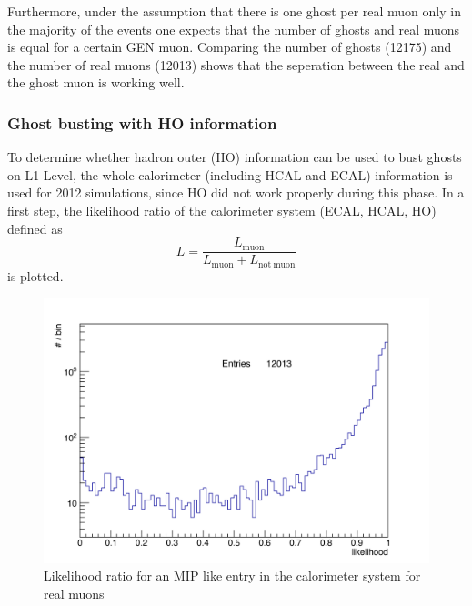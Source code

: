 Furthermore, under the assumption that there is one ghost per real muon only in the majority of the events one expects that the number of ghosts and real muons is equal for a certain GEN muon. Comparing the number of ghosts (12175) and the number of real muons (12013) shows that the seperation between the real and the ghost muon is working well.

\subsubsection{Ghost busting with HO information}
To determine whether hadron outer (HO) information can be used to bust ghosts on L1 Level, the whole calorimeter (including HCAL and ECAL) information is used for 2012 simulations, since HO did not work properly during this phase. In a first step, the likelihood ratio of the calorimeter system (ECAL, HCAL, HO) defined as
\begin{equation}
L=\frac{L_{\mathrm{muon}}}{L_{\mathrm{muon}} + L_\mathrm{not\ muon}}
\end{equation}
is plotted.
\begin{figure}[b]
\centering
\begin{minipage}[t]{0.95\textwidth}
\includegraphics[width=\textwidth]{Figures/scheuch/LikelihoodNonGhost.png}
\caption{Likelihood ratio for an MIP like entry in the calorimeter system for real muons}
\label{LikelihoodReal}
\end{minipage}
\end{figure}
